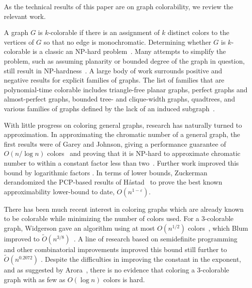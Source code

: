 \documentclass{llncs}
\begin{document}
As the technical results of this paper are on graph colorability, we review
the relevant work.

A graph $G$ is $k$-colorable if there is an assignment of $k$ distinct colors
to the vertices of $G$ so that no edge is monochromatic. Determining whether
$G$ is $k$-colorable is a classic an NP-hard problem~\cite{Karp72}. Many 
attempts to simplify the problem, such as assuming planarity or bounded degree
of the graph in question, still result in NP-hardness~\cite{Dailey80}. A large
body of work surrounds positive and negative results for explicit families of
graphs. The list of families that are polynomial-time colorable includes
triangle-free planar graphs, perfect graphs and almost-perfect graphs, bounded
tree- and clique-width graphs, quadtrees, and various families of graphs
defined by the lack of an induced
subgraph~\cite{HMM10,Ko03,EBH99,Cai03,KKTW01}.

With little progress on coloring general graphs, research has naturally turned
to approximation. In approximating the chromatic number of a general graph, the
first results were of Garey and Johnson, giving a performance guarantee of
$O(n/\log n)$ colors~\cite{Johnson74} and proving that it is NP-hard to
approximate chromatic number to within a constant factor less than
two~\cite{GJ76}. Further work improved this bound by logarithmic factors
\cite{BR90,Ha93}. In terms of lower bounds, Zuckerman~\cite{Zu07} derandomized
the PCP-based results of H{\aa}stad~\cite{Ha99} to prove the best known
approximability lower-bound to date, $O(n^{1-\varepsilon})$.

There has been much recent interest in coloring graphs which are already known
to be colorable while minimizing the number of colors used. For a 3-colorable
graph, Widgerson gave an algorithm using at most $O(n^{1/2})$
colors~\cite{Wi83}, which Blum improved to $\tilde{O}(n^{3/8})$~\cite{Blum94}.
A line of research based on semidefinite programming and other combinatorial
improvements improved this bound still further to $\tilde{O}(n^{0.2072})$
\cite{Ka98,Blum97,Arora06,Chl09,KT12}. Despite the difficulties in improving
the constant in the exponent, and as suggested by Arora~\cite{Arora11}, there
is no evidence that coloring a 3-colorable graph with as few as $O(\log n)$
colors is hard.
\end{document}
